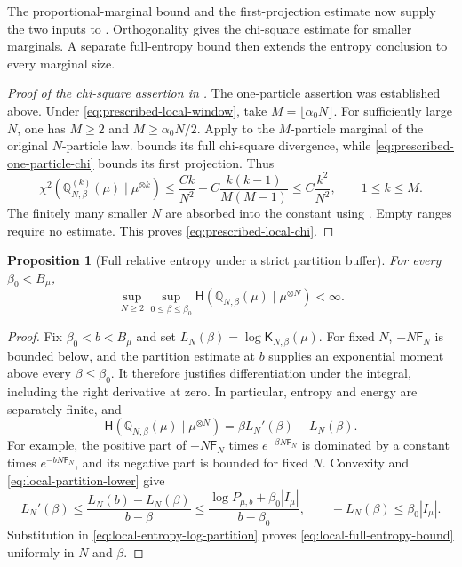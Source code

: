 \documentclass[11pt,reqno]{amsart}
\numberwithin{equation}{section}
\theoremstyle{plain}
\newtheorem{prop}[prop]{Proposition}
\theoremstyle{definition}
\newcommand{\Q}{\mathbb Q}
\newcommand{\be}{\beta}
\newcommand{\al}{\alpha}
\newcommand{\K}{\mathsf K}
\newcommand{\Fr}{\mathsf F}
\newcommand{\Hr}{\mathsf H}
\begin{document}
The proportional-marginal bound and the first-projection estimate now supply the two inputs to . Orthogonality gives the chi-square estimate for smaller marginals. A separate full-entropy bound then extends the entropy conclusion to every marginal size.

\begin{proof}[Proof of the chi-square assertion in ]
The one-particle assertion was established above. Under \eqref{eq:prescribed-local-window}, take $M=\lfloor\al_0N\rfloor$. For sufficiently large $N$, one has $M\geq2$ and $M\geq\al_0N/2$. Apply  to the $M$-particle marginal of the original $N$-particle law.  bounds its full chi-square divergence, while \eqref{eq:prescribed-one-particle-chi} bounds its first projection. Thus
\begin{equation}
 \chi^2\!\left(\Q_{N,\be}^{(k)}(\mu)\mid\mu^{\otimes k}\right)
 \leq\frac{Ck}{N^2}+C\frac{k(k-1)}{M(M-1)}
 \leq C\frac{k^2}{N^2},\qquad 1\leq k\leq M.
 \label{eq:local-chi-square-closure}
\end{equation}
The finitely many smaller $N$ are absorbed into the constant using . Empty ranges require no estimate. This proves \eqref{eq:prescribed-local-chi}.
\end{proof}

\begin{prop}[Full relative entropy under a strict partition buffer]
\label{prop:local-full-entropy}
For every $\be_0<B_\mu$,
\begin{equation}
 \sup_{N\geq2}\sup_{0\leq\be\leq\be_0}
 \Hr\!\left(\Q_{N,\be}(\mu)\mid\mu^{\otimes N}\right)<\infty.
 \label{eq:local-full-entropy-bound}
\end{equation}
\end{prop}
\begin{proof}
Fix $\be_0<b<B_\mu$ and set $L_N(\be)=\log\K_{N,\be}(\mu)$. For fixed $N$, $-N\Fr_N$ is bounded below, and the partition estimate at $b$ supplies an exponential moment above every $\be\leq\be_0$. It therefore justifies differentiation under the integral, including the right derivative at zero. In particular, entropy and energy are separately finite, and
\begin{equation}
 \Hr\!\left(\Q_{N,\be}(\mu)\mid\mu^{\otimes N}\right)
 =\be L_N'(\be)-L_N(\be).
 \label{eq:local-entropy-log-partition}
\end{equation}
For example, the positive part of $-N\Fr_N$ times $e^{-\be N\Fr_N}$ is dominated by a constant times $e^{-bN\Fr_N}$, and its negative part is bounded for fixed $N$. Convexity and \eqref{eq:local-partition-lower} give
\begin{equation}
 L_N'(\be)\leq\frac{L_N(b)-L_N(\be)}{b-\be}
 \leq\frac{\log P_{\mu,b}+\be_0|I_\mu|}{b-\be_0},
 \qquad -L_N(\be)\leq\be_0|I_\mu|.
 \label{eq:local-entropy-partition-bound}
\end{equation}
Substitution in \eqref{eq:local-entropy-log-partition} proves \eqref{eq:local-full-entropy-bound} uniformly in $N$ and $\be$.
\end{proof}
\end{document}
